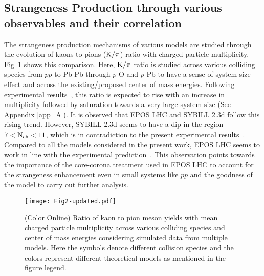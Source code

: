 \documentclass[aps,twocolumn,nofootinbib]{revtex4-1}
\begin{document}

\subsection{Strangeness Production through various observables and their correlation}
\label{subsec1}

The strangeness production mechanisms of various models are studied through the evolution of kaons to pions ($\rm{K/\pi}$) ratio with charged-particle multiplicity. Fig~\ref{fig2} shows this comparison. Here, $\rm{K/\pi}$ ratio is studied across various colliding species from $pp$ to Pb-Pb through $p$-O and $p$-Pb to have a sense of system size effect and across the existing/proposed center of mass energies. Following experimental results~\cite{ALICE:2020nkc}, this ratio is expected to rise with an increase in multiplicity followed by saturation towards a very large system size (See Appendix \ref{app_A}). It is observed that EPOS LHC and SYBILL 2.3d follow this rising trend. However, SYBILL 2.3d seems to have a dip in the region $7< \rm{N}_{ch}<11$, which is in contradiction to the present experimental results~\cite{ALICE:2020nkc}. Compared to all the models considered in the present work, EPOS LHC seems to work in line with the experimental prediction~\cite{ALICE:2020nkc}. This observation points towards the importance of the core-corona treatment used in EPOS LHC to account for the strangeness enhancement 
even in small systems like $pp$ and the goodness of the model to carry out further analysis.\\

\begin{figure}[ht!]
\texttt{[image: Fig2-updated.pdf]}
\caption{(Color Online) Ratio of kaon to pion meson yields with mean charged particle multiplicity across various colliding species and center of mass energies considering simulated data from multiple models. Here the symbols denote different collision species and the colors represent different theoretical models as mentioned in the figure legend.}
\label{fig2}
\end{figure}
\end{document}
